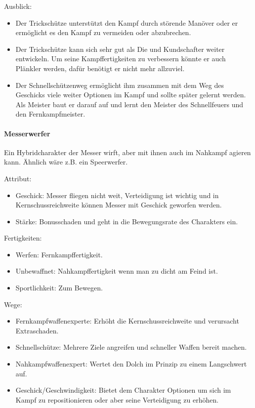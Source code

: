 \documentclass{article}
\begin{document}
Ausblick:
\begin{itemize}
\item Der Trickschütze unterstützt den Kampf durch störende Manöver oder er ermöglicht es den Kampf zu vermeiden oder abzubrechen.
\item Der Trickschütze kann sich sehr gut als Die und Kundschafter weiter entwickeln. Um seine Kampffertigkeiten zu verbessern könnte er auch Plänkler werden, dafür benötigt er nicht mehr allzuviel.
\item Der Schnellschützenweg ermöglicht ihm zusammen mit dem Weg des Geschicks viele weiter Optionen im Kampf und sollte später gelernt werden. Als Meister baut er darauf auf und lernt den Meister des Schnellfeuers und den Fernkampfmeister.
\end{itemize}

\paragraph{Messerwerfer}
Ein Hybridcharakter der Messer wirft, aber mit ihnen auch im Nahkampf agieren kann. Ähnlich wäre z.B. ein Speerwerfer.

Attribut:
\begin{itemize}
\item Geschick: Messer fliegen nicht weit, Verteidigung ist wichtig und in Kernschussreichweite können Messer mit Geschick geworfen werden.
\item Stärke: Bonusschaden und geht in die Bewegungsrate des Charakters ein.
\end{itemize}

Fertigkeiten:
\begin{itemize}
\item Werfen: Fernkampffertigkeit.
\item Unbewaffnet: Nahkampffertigkeit wenn man zu dicht am Feind ist.
\item Sportlichkeit: Zum Bewegen.
\end{itemize}

Wege:
\begin{itemize}
\item Fernkampfwaffenexperte: Erhöht die Kernschussreichweite und verursacht Extraschaden.
\item Schnellschütze: Mehrere Ziele angreifen und schneller Waffen bereit machen.
\item Nahkampfwaffenexpert: Wertet den Dolch im Prinzip zu einem Langschwert auf.
\item Geschick/Geschwindigkeit: Bietet dem Charakter Optionen um sich im Kampf zu repositionieren oder aber seine Verteidigung zu erhöhen.
\end{itemize}
\end{document}
